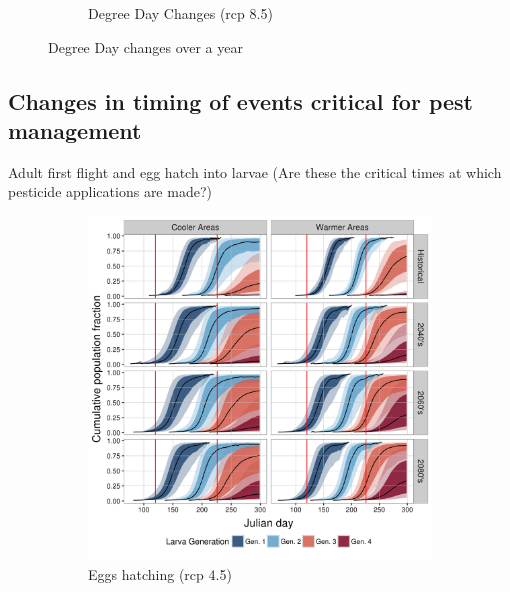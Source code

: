 \documentclass[12pt]{article}
\theoremstyle{plain}
\theoremstyle{definition}
\theoremstyle{definition}
\begin{document}
\begin{figure}[h!]
\begin{subfigure}{.46\textwidth}
  \label{fig:DDC85}
\caption{Degree Day Changes (rcp 8.5)}
\end{subfigure}
\caption{Degree Day changes over a year}
\label{fig:DDC}
\end{figure}
\fi
\pagebreak
\subsection{Changes in timing of events critical for pest management}
Adult first flight and egg hatch into larvae (Are these the critical times at which pesticide applications are made?) 

\begin{figure}[h!]
    \centering
    \begin{subfigure}[b]{0.48\textwidth}
        \includegraphics[width=\textwidth]{figures/eggHatch_rcp45}
        \caption{Eggs hatching (rcp 4.5)}
        \label{fig:Eggs_Hatch_45)}
    \end{subfigure}
    ~ %
    \begin{subfigure}[b]{0.48\textwidth}

\end{subfigure}
\end{figure}
\end{document}
